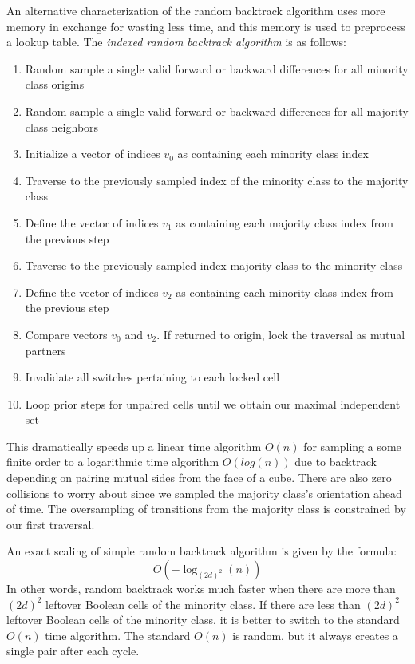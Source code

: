 \documentclass[10pt, a5paper, twoside, openright]{memoir}
\begin{document}
An alternative characterization of the random backtrack algorithm uses more memory in exchange for wasting less time, and this memory is used to preprocess a lookup table. The \textit{indexed random backtrack algorithm} is as follows:
\begin{enumerate}
\item Random sample a single valid forward or backward differences for all minority class origins 
\item Random sample a single valid forward or backward differences for all majority class neighbors 
\item Initialize a vector of indices $v_0$ as containing each minority class index
\item Traverse to the previously sampled index of the minority class to the majority class
\item Define the vector of indices $v_1$ as containing each majority class index from the previous step
\item Traverse to the previously sampled index majority class to the minority class
\item Define the vector of indices $v_2$ as containing each minority class index from the previous step
\item Compare vectors $v_0$ and $v_2$. If returned to origin, lock the traversal as mutual partners
\item Invalidate all switches pertaining to each locked cell
\item Loop prior steps for unpaired cells until we obtain our maximal independent set
\end{enumerate}
This dramatically speeds up a linear time algorithm $O(n)$ for sampling a some finite order to a logarithmic time algorithm $O(log(n))$ due to backtrack depending on pairing mutual sides from the face of a cube. There are also zero collisions to worry about since we sampled the majority class's orientation ahead of time. The oversampling of transitions from the majority class is constrained by our first traversal.

An exact scaling of simple random backtrack algorithm is given by the formula: 
$$O(-\log_{(2d)^2}(n))$$
In other words, random backtrack works much faster when there are more than $(2d)^2$ leftover Boolean cells of the minority class. If there are less than $(2d)^2$ leftover Boolean cells of the minority class, it is better to switch to the standard $O(n)$ time algorithm. The standard $O(n)$ is random, but it always creates a single pair after each cycle.
\end{document}

